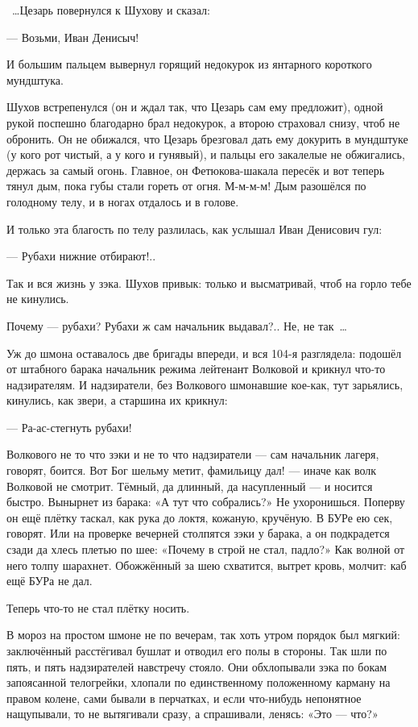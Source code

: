 ~\dots{}Цезарь повернулся к Шухову и сказал:

--- Возьми, Иван Денисыч!

И большим пальцем вывернул горящий недокурок из янтарного короткого мундштука.

Шухов встрепенулся (он и ждал так, что Цезарь сам ему предложит), одной рукой поспешно 
благодарно брал недокурок, а второю страховал снизу, чтоб не обронить. Он не обижался, что 
Цезарь брезговал дать ему докурить в мундштуке (у кого рот чистый, а у кого и гунявый), и 
пальцы его закалелые не обжигались, держась за самый огонь. Главное, он Фетюкова-шакала 
пересёк и вот теперь тянул дым, пока губы стали гореть от огня. М-м-м-м! Дым разошёлся по 
голодному телу, и в ногах отдалось и в голове.

И только эта благость по телу разлилась, как услышал Иван Денисович гул:

--- Рубахи нижние отбирают!..

Так и вся жизнь у зэка. Шухов привык: только и высматривай, чтоб на горло тебе не кинулись.

Почему --- рубахи? Рубахи ж сам начальник выдавал?.. Не, не так~\dots{}

Уж до шмона оставалось две бригады впереди, и вся 104-я разглядела: подошёл от штабного барака 
начальник режима лейтенант Волковой и крикнул что-то надзирателям. И надзиратели, без 
Волкового шмонавшие кое-как, тут зарьялись, кинулись, как звери, а старшина их крикнул:

--- Ра-ас-стегнуть рубахи!

Волкового не то что зэки и не то что надзиратели --- сам начальник лагеря, говорят, боится. Вот 
Бог шельму метит, фамильицу дал! --- иначе как волк Волковой не смотрит. Тёмный, да длинный, да 
насупленный --- и носится быстро. Вынырнет из барака: «А тут что собрались?» Не ухоронишься. 
Поперву он ещё плётку таскал, как рука до локтя, кожаную, кручёную. В БУРе ею сек, говорят. Или 
на проверке вечерней столпятся зэки у барака, а он подкрадется сзади да хлесь плетью по шее: 
«Почему в строй не стал, падло?» Как волной от него толпу шарахнет. Обожжённый за шею 
схватится, вытрет кровь, молчит: каб ещё БУРа не дал.

Теперь что-то не стал плётку носить.

В мороз на простом шмоне не по вечерам, так хоть утром порядок был мягкий: заключённый 
расстёгивал бушлат и отводил его полы в стороны. Так шли по пять, и пять надзирателей 
навстречу стояло. Они обхлопывали зэка по бокам запоясанной телогрейки, хлопали по 
единственному положенному карману на правом колене, сами бывали в перчатках, и если 
что-нибудь непонятное нащупывали, то не вытягивали сразу, а спрашивали, ленясь: «Это --- что?»

